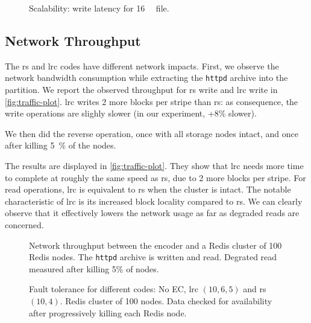 \begin{figure}[t]
    \centering
    
    \caption{Scalability: write latency for \SI{16}{\mebi\byte} file.}
    \label{fig:latency-plot}
\end{figure}


\subsection{Network Throughput}
\label{subsec:network-traffic}
The \ac{rs} and \ac{lrc} codes have different network impacts.
First, we observe the network bandwidth consumption while extracting the \texttt{httpd} archive into the \SYS partition.
We report the observed throughput for \ac{rs} write and \ac{lrc} write in \autoref{fig:traffic-plot}.
\ac{lrc} writes 2 more blocks per stripe than \ac{rs}: as consequence, the write operations are slighly slower (in our experiment, +8\% slower). %

We then did the reverse operation, once with all storage nodes intact, and once after killing \SI{5}{\percent} of the nodes.

The results are displayed in \autoref{fig:traffic-plot}.
They show that \ac{lrc} needs more time to complete at roughly the same speed as \ac{rs}, due to 2 more blocks per stripe.
For read operations, \ac{lrc} is equivalent to \ac{rs} when the cluster is intact.
The notable characteristic of \ac{lrc} is its increased block locality compared to \ac{rs}.
We can clearly observe that it effectively lowers the network usage as far as degraded reads are concerned.
\begin{figure*}
    \centering
    
    \caption{Network throughput between the encoder and a Redis cluster of 100 Redis nodes. The \texttt{httpd} archive is written and read. Degrated read measured after killing 5\% of nodes.}
    \label{fig:traffic-plot}
\end{figure*}

\begin{figure}[ht]
    \centering
    
    \caption{Fault tolerance for different codes: No EC, \ac{lrc} $\left(10,6,5\right)$ and \ac{rs} $\left(10,4\right)$. Redis cluster of 100 nodes. Data checked for availability after progressively killing each Redis node.}
    \label{fig:checksum-plot}
\end{figure}

